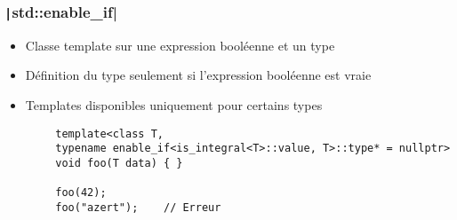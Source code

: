 \documentclass[C++.tex]{subfiles}
\begin{document}
\begin{frame}[fragile]
	\frametitle{\texttt|std::enable_if|}
	\begin{itemize}
		\item Classe template sur une expression booléenne et un type
		\item Définition du type seulement si l'expression booléenne est vraie
		\item Templates disponibles uniquement pour certains types
	\end{itemize}

	\begin{verbatim}
		template<class T, 
		typename enable_if<is_integral<T>::value, T>::type* = nullptr>
		void foo(T data) { }

		foo(42);
		foo("azert");    // Erreur
	\end{verbatim}

\end{frame}
\end{document}
